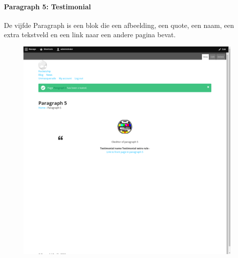 \paragraph{Paragraph 5: Testimonial}
De vijfde Paragraph is een blok die een afbeelding, een quote, een  naam, een extra tekstveld en een link naar een andere pagina bevat.
\begin{figure}[h]
\includegraphics[width=1\textwidth]{img/p005.png}
\end{figure}

\clearpage
